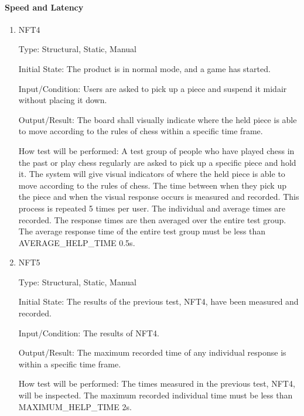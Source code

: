 \documentclass[12pt, titlepage]{article}
\begin{document}
\paragraph{Speed and Latency}
\begin{enumerate}
    \item{NFT4}

        Type: Structural, Static, Manual
                            
        Initial State: The product is in normal mode, and a game has started.
                            
        Input/Condition: Users are asked to pick up a piece and suspend it midair without placing it down.
                            
        Output/Result: The board shall visually indicate where the held piece is able to move according to the rules of chess within a specific time frame.
                            
        How test will be performed: A test group of people who have played chess in the past or play chess regularly are asked to pick up a specific piece and 
            hold it. The system will give visual indicators of where the held piece is able to move according to the rules of chess. The time between when 
            they pick up the piece and when the visual response occurs is measured and recorded. This process is repeated 5 times per user. The individual and average
            times are recorded. The response times are then averaged over the entire test group. The average response time of the entire test group must be less than 
            AVERAGE\_HELP\_TIME 0.5s.
                        
    \item{NFT5}

        Type: Structural, Static, Manual
                            
        Initial State: The results of the previous test, NFT4, have been measured and recorded.
                            
        Input/Condition: The results of NFT4.
                            
        Output/Result: The maximum recorded time of any individual response is within a specific time frame.
                            
        How test will be performed: The times measured in the previous test, NFT4, will be inspected. The maximum recorded individual time must be less than 
            MAXIMUM\_HELP\_TIME 2s.


\end{enumerate}
\end{document}
